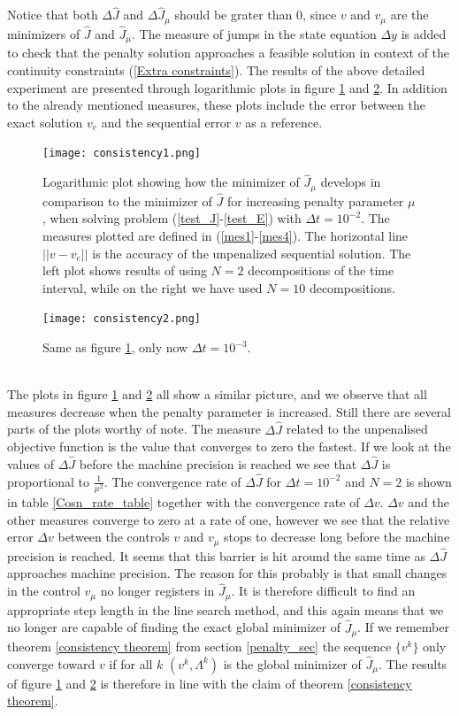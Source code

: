 Notice that both $\Delta\hat J$ and $\Delta \hat J_{\mu}$ should be grater than $0$, since $v$ and $v_{\mu}$ are the minimizers of $\hat J$ and $\hat J_ {\mu}$. The measure of jumps in the state equation $\Delta y$ is added to check that the penalty solution approaches a feasible solution in context of the continuity constraints (\ref{Extra constraints}). The results of the above detailed experiment are presented through logarithmic plots in figure \ref{Cons1_fig} and \ref{Cons2_fig}. In addition to the already mentioned measures, these plots include the error between the exact solution $v_e$ and the sequential error $v$ as a reference.
\\
\begin{figure}[!h]
\centering
\texttt{[image: consistency1.png]}
\caption{Logarithmic plot showing how the minimizer of $\hat J_{\mu}$ develops in comparison to the minimizer of $\hat J$ for increasing penalty parameter $\mu$, when solving problem (\ref{test_J}-\ref{test_E}) with $\Delta t = 10^{-2}$. The measures plotted are defined in (\ref{mes1}-\ref{mes4}). The horizontal line $||v-v_e||$ is the accuracy of the unpenalized sequential solution. The left plot shows results of using $N=2$ decompositions of the time interval, while on the right we have used $N=10$ decompositions.}
\label{Cons1_fig}
\end{figure}
\noindent
\begin{figure}[!h]
\centering
\texttt{[image: consistency2.png]}
\caption{Same as figure \ref{Cons1_fig}, only now $\Delta t = 10^{-3}$.}
\label{Cons2_fig}
\end{figure}
\noindent
\\
The plots in figure \ref{Cons1_fig} and \ref{Cons2_fig} all show a similar picture, and we observe that all measures decrease when the penalty parameter is increased. Still there are several parts of the plots worthy of note. The measure $\Delta\hat J$ related to the unpenalised objective function is the value that converges to zero the fastest. If we look at the values of $\Delta\hat J$ before the machine precision is reached we see that $\Delta \hat J$ is proportional to $\frac{1}{\mu^2}$. The convergence rate of $\Delta\hat J$ for $\Delta t=10^{-2}$ and $N=2$ is shown in table \ref{Cosn_rate_table} together with the convergence rate of $\Delta v$. $\Delta v$ and the other measures converge to zero at a rate of one, however we see that the relative error $\Delta v$ between the controls $v$ and $v_{\mu}$ stops to decrease long before the machine precision is reached. It seems that this barrier is hit around the same time as $\Delta\hat J$ approaches machine precision. The reason for this probably is that small changes in the control $v_{\mu}$ no longer registers in $\hat J_{\mu}$. It is therefore difficult to find an appropriate step length in the line search method, and this again means that we no longer are capable of finding the exact global minimizer of $\hat J_{\mu}$. If we remember theorem \ref{consistency theorem} from section \ref{penalty_sec} the sequence $\{v^{k}\}$ only converge toward $v$ if for all $k$ $(v^{k},\Lambda^k)$ is the global minimizer of $\hat J_{\mu}$. The results of figure \ref{Cons1_fig} and \ref{Cons2_fig} is therefore in line with the claim of theorem \ref{consistency theorem}.
